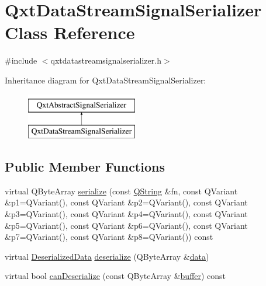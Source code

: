 \hypertarget{class_qxt_data_stream_signal_serializer}{\section{Qxt\-Data\-Stream\-Signal\-Serializer Class Reference}
\label{class_qxt_data_stream_signal_serializer}
}


{\ttfamily \#include $<$qxtdatastreamsignalserializer.\-h$>$}

Inheritance diagram for Qxt\-Data\-Stream\-Signal\-Serializer\-:\begin{figure}[H]
\begin{center}
\leavevmode
\includegraphics[height=2.000000cm]{class_qxt_data_stream_signal_serializer}
\end{center}
\end{figure}
\subsection*{Public Member Functions}
\begin{DoxyCompactItemize}
\item 
virtual Q\-Byte\-Array \hyperlink{class_qxt_data_stream_signal_serializer_a6e86a392da2a0e8d294c1c0ee4054de5}{serialize} (const \hyperlink{group___u_a_v_objects_plugin_gab9d252f49c333c94a72f97ce3105a32d}{Q\-String} \&fn, const Q\-Variant \&p1=Q\-Variant(), const Q\-Variant \&p2=Q\-Variant(), const Q\-Variant \&p3=Q\-Variant(), const Q\-Variant \&p4=Q\-Variant(), const Q\-Variant \&p5=Q\-Variant(), const Q\-Variant \&p6=Q\-Variant(), const Q\-Variant \&p7=Q\-Variant(), const Q\-Variant \&p8=Q\-Variant()) const 
\item 
virtual \hyperlink{class_qxt_abstract_signal_serializer_a101019f7e2f0c3267e01c1da89104b40}{Deserialized\-Data} \hyperlink{class_qxt_data_stream_signal_serializer_af617ea882cc50e3d644a0ff4229954e1}{deserialize} (Q\-Byte\-Array \&\hyperlink{glext_8h_a8850df0785e6fbcc2351af3b686b8c7a}{data})
\item 
virtual bool \hyperlink{class_qxt_data_stream_signal_serializer_a520cb8220d2fe4fc2c202d5d8475ec6a}{can\-Deserialize} (const Q\-Byte\-Array \&\hyperlink{glext_8h_af1b5122dc7bfe0a6319e14419cfe3423}{buffer}) const 
\end{DoxyCompactItemize}

